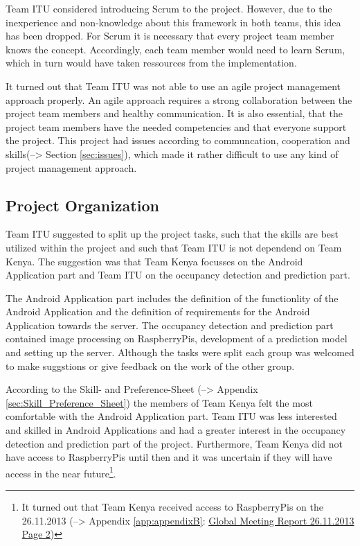 Team ITU considered introducing Scrum to the project. However, due to the inexperience and non-knowledge about this framework in both teams, this idea has been dropped. For Scrum it is necessary that every project team member knows the concept. Accordingly, each team member would need to learn Scrum, which in turn would have taken ressources from the implementation.

It turned out that Team ITU was not able to use an agile project management approach properly. An agile approach requires a strong collaboration between the project team members and healthy communication. It is also essential, that the project team members have the needed competencies and that everyone support the project\cite{agile_project_management}. This project had issues according to communcation, cooperation and skills(--> Section \ref{sec:issues}), which made it rather difficult to use any kind of project management approach.



\subsection{Project Organization}
\label{sec:organization}
Team ITU suggested to split up the project tasks, such that the skills are best utilized within the project and such that Team ITU is not dependend on Team Kenya. The suggestion was that Team Kenya focusses on the Android Application part and Team ITU on the occupancy detection and prediction part.

The Android Application part includes the definition of the functionlity of the Android Application and the definition of requirements for the Android Application towards the server. The occupancy detection and prediction part contained image processing on RaspberryPis, development of a prediction model and setting up the server. Although the tasks were split each group was welcomed to make suggstions or give feedback on the work of the other group.

According to the Skill- and Preference-Sheet (--> Appendix \ref{sec:Skill_Preference_Sheet}) the members of Team Kenya felt the most comfortable with the Android Application part. Team ITU was less interested and skilled in Android Applications and had a greater interest in the occupancy detection and prediction part of the project. Furthermore, Team Kenya did not have access to RaspberryPis until then and it was uncertain if they will have access in the near future\footnote{It turned out that Team Kenya received access to RaspberryPis on the 26.11.2013 (--> Appendix \ref{app:appendixB}: \hyperlink{GSD20131126.2}{Global Meeting Report 26.11.2013 Page 2})}.

